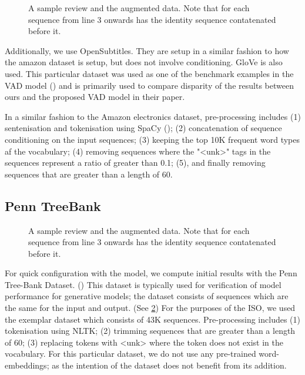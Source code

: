 \documentclass[12pt,twoside]{report}
\begin{document}
\begin{figure}[!ht]
	\centering
	
	
	\caption{A sample review and the augmented data. Note that for each sequence from line 3 onwards has the identity sequence contatenated before it. \label{aug_1}}
	\end{figure}

Additionally, we use OpenSubtitles. They are setup in a similar fashion to how the amazon dataset is setup, but does not involve conditioning. GloVe is also used. This particular dataset was used as one of the benchmark examples in the VAD model (\cite{du_variational_2018}) and is primarily used to compare disparity of the results between ours and the proposed VAD model in their paper.

In a similar fashion to the Amazon electronics dataset, pre-processing includes (1) sentenisation and tokenisation using SpaCy (\cite{honnibal_spacy_2017}); (2) concatenation of sequence conditioning on the input sequences; (3) keeping the top 10K frequent word types af the vocabulary; (4) removing sequences where the "<unk>" tags in the sequences represent a ratio of greater than 0.1; (5), and finally removing sequences that are greater than a length of 60. 


\subsection{Penn TreeBank}


\begin{figure}[!ht]
	\centering
	
	\caption{A sample review and the augmented data. Note that for each sequence from line 3 onwards has the identity sequence contatenated before it. \label{ptb_example}}
	\end{figure}

For quick configuration with the model, we compute initial results with the Penn Tree-Bank Dataset. (\cite{marcus_building_2002}) This dataset is typically used for verification of model performance for generative models; the dataset consists of sequences which are the same for the input and output. (See \ref{ptb_example}) For the purposes of the ISO, we used the exemplar dataset which consists of 43K sequences. Pre-processing includes (1) tokenisation using NLTK; (2) trimming sequences that are greater than a length of 60; (3) replacing tokens with <unk> where the token does not exist in the vocabulary. For this particular dataset, we do not use any pre-trained word-embeddings; as the intention of the dataset does not benefit from its addition. 
\end{document}

